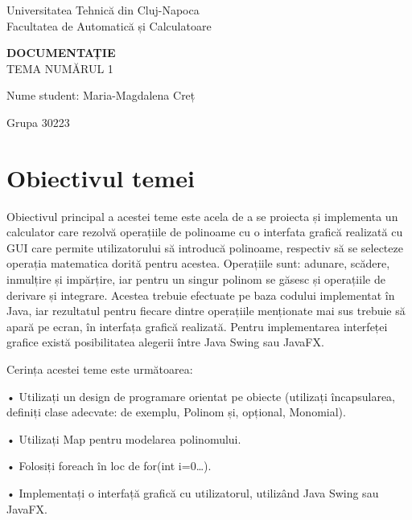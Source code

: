 \documentclass[a4paper,12pt]{article}
\begin{document}
\begin{center}
\large Universitatea Tehnică din Cluj-Napoca \\
\large Facultatea de Automatică și Calculatoare \\
\vspace{1 cm}

\Huge\textbf{DOCUMENTAȚIE}\hfill \\
\vspace{0.5 cm}
\Large TEMA NUMĂRUL 1\\
\vspace{1cm}
\end{center}

\begin{center}
\large Nume student: Maria-Magdalena Creț
\end{center}
\begin{center}
\large Grupa 30223
\end{center}

\newpage
\vspace{3cm}
\tableofcontents


\newpage
\vspace{3cm}
\section{Obiectivul temei}
Obiectivul principal a acestei teme este acela de a se proiecta și implementa un calculator care rezolvă operațiile de polinoame cu o interfata grafică realizată cu GUI care permite utilizatorului să introducă polinoame, respectiv să se selecteze operația matematica dorită pentru acestea. Operațiile sunt: adunare, scădere, inmulțire și impărțire, iar pentru un singur polinom se găsesc și operațiile de derivare și integrare. Acestea trebuie efectuate pe baza codului implementat în Java, iar rezultatul pentru fiecare dintre operațiile menționate mai sus trebuie să apară pe ecran, în interfața grafică realizată. Pentru implementarea interfeței grafice există posibilitatea alegerii între Java Swing sau JavaFX.

Cerința acestei teme este următoarea:

• Utilizați un design de programare orientat pe obiecte (utilizați încapsularea, definiți clase adecvate: de exemplu, Polinom și, opțional, Monomial).

• Utilizați Map pentru modelarea polinomului.

• Folosiți foreach în loc de for(int i=0…).

• Implementați o interfață grafică cu utilizatorul, utilizând Java Swing sau JavaFX.
\end{document}
